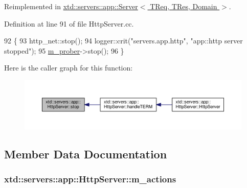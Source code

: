 Reimplemented in \hyperlink{classxtd_1_1servers_1_1app_1_1Server_a37fe0eca660f81a9edde0c1ce6938f39}{xtd\+::servers\+::app\+::\+Server$<$ T\+Req, T\+Res, Domain $>$}.



Definition at line 91 of file Http\+Server.\+cc.


\begin{DoxyCode}
92 \{
93   http\_net::stop();
94   logger::crit(\textcolor{stringliteral}{"servers.app.http"}, \textcolor{stringliteral}{"app::http server stopped"});
95   \hyperlink{classxtd_1_1servers_1_1app_1_1HttpServer_aa26ddc958ab07774e8ba45e89dc0011b}{m\_prober}->stop();
96 \}
\end{DoxyCode}


Here is the caller graph for this function\+:
\nopagebreak
\begin{figure}[H]
\begin{center}
\leavevmode
\includegraphics[width=350pt]{classxtd_1_1servers_1_1app_1_1HttpServer_a7fdba08e0fa4dc9bbec30a989ccf4049_icgraph}
\end{center}
\end{figure}




\subsection{Member Data Documentation}
\subsubsection[{\texorpdfstring{m\+\_\+actions}{m_actions}}]{ xtd\+::servers\+::app\+::\+Http\+Server\+::m\+\_\+actions\hspace{0.3cm}{\ttfamily [protected]}}\hypertarget{classxtd_1_1servers_1_1app_1_1HttpServer_afa5363da18a3aa9de651e53e409116e9}{}\label{classxtd_1_1servers_1_1app_1_1HttpServer_afa5363da18a3aa9de651e53e409116e9}


